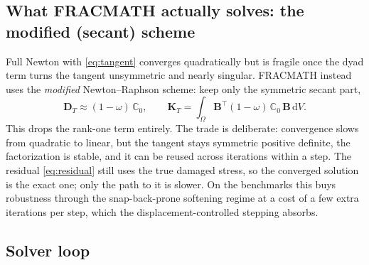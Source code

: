 \documentclass[11pt]{article}
\newcommand{\C}{\mathbb{C}}
\newcommand{\dd}{\,\mathrm{d}}
\begin{document}
\subsection{What FRACMATH actually solves: the modified (secant) scheme}

Full Newton with \eqref{eq:tangent} converges quadratically but is fragile once the dyad
term turns the tangent unsymmetric and nearly singular. FRACMATH instead uses the
\emph{modified} Newton--Raphson scheme: keep only the symmetric secant part,
%
\begin{equation}
\bm D_T \approx (1-\omega)\,\C_0,
\qquad
\bm K_T = \int_\Omega \bm B^{\!\top}(1-\omega)\,\C_0\,\bm B \dd V .
\label{eq:secant}
\end{equation}
%
This drops the rank-one term entirely. The trade is deliberate: convergence slows from
quadratic to linear, but the tangent stays symmetric positive definite, the factorization
is stable, and it can be reused across iterations within a step. The residual
\eqref{eq:residual} still uses the true damaged stress, so the converged solution is the
exact one; only the path to it is slower. On the benchmarks this buys robustness through
the snap-back-prone softening regime at a cost of a few extra iterations per step, which
the displacement-controlled stepping absorbs.

\subsection{Solver loop}
\end{document}
